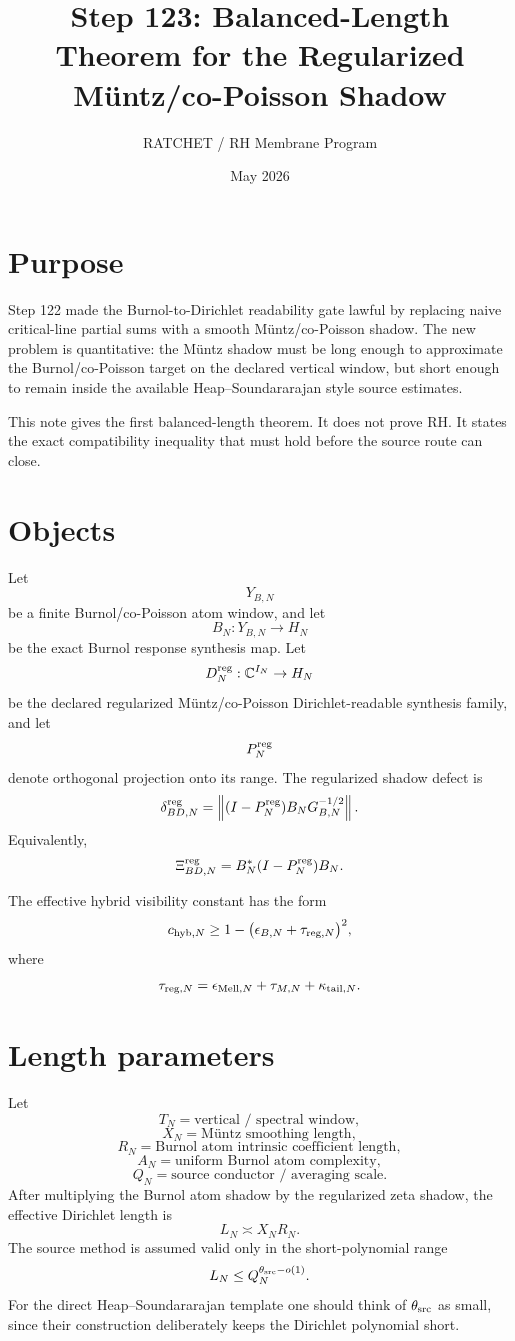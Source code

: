 \documentclass[11pt]{article}
\title{Step 123: Balanced-Length Theorem for the Regularized Müntz/co-Poisson Shadow}
\author{RATCHET / RH Membrane Program}
\date{May 2026}
\begin{document}
\maketitle

\section{Purpose}
Step 122 made the Burnol-to-Dirichlet readability gate lawful by replacing naive critical-line partial sums with a smooth M\"untz/co-Poisson shadow.  The new problem is quantitative: the M\"untz shadow must be long enough to approximate the Burnol/co-Poisson target on the declared vertical window, but short enough to remain inside the available Heap--Soundararajan style source estimates.

This note gives the first balanced-length theorem.  It does not prove RH.  It states the exact compatibility inequality that must hold before the source route can close.

\section{Objects}
Let
\[
Y_{B,N}
\]
be a finite Burnol/co-Poisson atom window, and let
\[
B_N:Y_{B,N}\to H_N
\]
be the exact Burnol response synthesis map.  Let
\[
D_N^{\rm reg}:\mathbb C^{I_N}\to H_N
\]
be the declared regularized M\"untz/co-Poisson Dirichlet-readable synthesis family, and let
\[
P_N^{\rm reg}
\]
denote orthogonal projection onto its range.  The regularized shadow defect is
\[
\delta_{BD,N}^{\rm reg}
=
\left\|(I-P_N^{\rm reg})B_NG_{B,N}^{-1/2}\right\|.
\]
Equivalently,
\[
\Xi_{BD,N}^{\rm reg}=B_N^*(I-P_N^{\rm reg})B_N.
\]

The effective hybrid visibility constant has the form
\[
c_{{\rm hyb},N}
\ge
1-
\bigl(
\epsilon_{B,N}+\tau_{{\rm reg},N}
\bigr)^2,
\]
where
\[
\tau_{{\rm reg},N}
=
\epsilon_{{\rm Mell},N}+\tau_{M,N}+\kappa_{{\rm tail},N}.
\]

\section{Length parameters}
Let
\[
T_N = \text{vertical / spectral window},
\]
\[
X_N = \text{M\"untz smoothing length},
\]
\[
R_N = \text{Burnol atom intrinsic coefficient length},
\]
\[
A_N = \text{uniform Burnol atom complexity},
\]
\[
Q_N = \text{source conductor / averaging scale}.
\]
After multiplying the Burnol atom shadow by the regularized zeta shadow, the effective Dirichlet length is
\[
L_N\asymp X_NR_N.
\]
The source method is assumed valid only in the short-polynomial range
\[
L_N\le Q_N^{\theta_{\rm src}-o(1)}.
\]
For the direct Heap--Soundararajan template one should think of \(\theta_{\rm src}\) as small, since their construction deliberately keeps the Dirichlet polynomial short.
\end{document}
